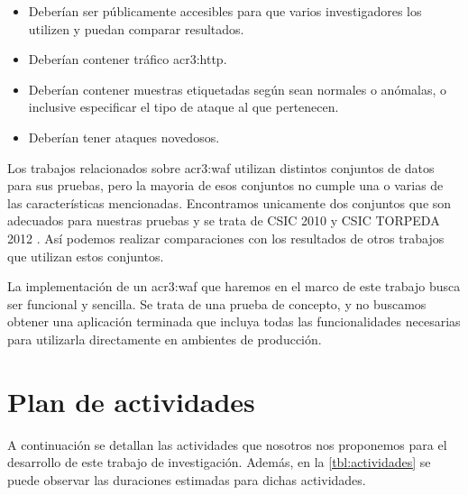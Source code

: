 \begin{itemize}
    \item
    Deberían ser públicamente accesibles para que varios investigadores
    los utilizen y puedan comparar resultados.

    \item
    Deberían contener tráfico \gls{acr3:http}.

    \item
    Deberían contener muestras etiquetadas según sean normales o
    anómalas, o inclusive especificar el tipo de ataque al que
    pertenecen.

    \item
    Deberían tener ataques novedosos.
\end{itemize}

Los trabajos relacionados sobre \gls{acr3:waf} utilizan distintos
conjuntos de datos para sus pruebas, pero la mayoria de esos
conjuntos no cumple una o varias de las características mencionadas.
Encontramos unicamente dos conjuntos que son adecuados para
nuestras pruebas y se trata de CSIC 2010 \cite{csic2010dataset} y
CSIC TORPEDA 2012 \cite{torpeda2012dataset}. Así podemos realizar
comparaciones con los resultados de otros trabajos que utilizan estos
conjuntos.
\bigskip

La implementación de un \gls{acr3:waf} que haremos en el marco de este
trabajo busca ser funcional y sencilla. Se trata de una prueba de concepto,
y no buscamos obtener una aplicación terminada que incluya todas las
funcionalidades necesarias para utilizarla directamente en ambientes de
producción.


\section{Plan de actividades}

A continuación se detallan las actividades que nosotros nos proponemos
para el desarrollo de este trabajo de investigación. Además, en la
\autoref{tbl:actividades} se puede observar las duraciones estimadas
para dichas actividades.

